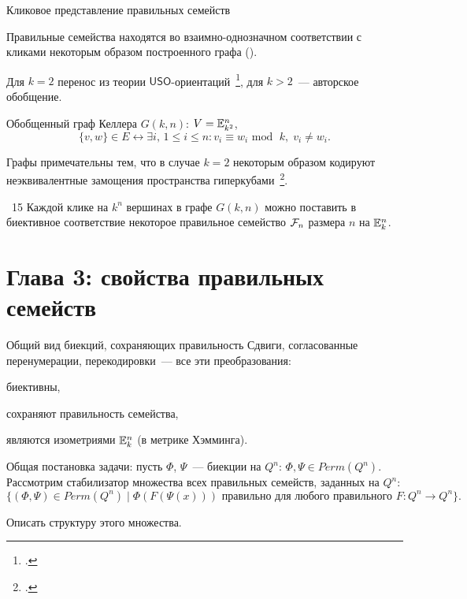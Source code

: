 \begin{frame}{Кликовое представление правильных семейств}
    \begin{coloritemize}
        \item Правильные семейства находятся во взаимно-однозначном соответствии с кликами некоторым образом построенного графа ().
        \pause
        \item Для $k=2$ перенос из теории $\mathsf{USO}$-ориентаций~\footcite{borzechowski2022universal}, для $k > 2$~--- авторское обобщение.
        \pause
        \item Обобщенный граф Келлера $G(k, n)$: $V = \mathbb{E}_{k^2}^n$, 
        \[
            \{v, w\} \in E \leftrightarrow \exists i, \, 1 \le i \le n \colon v_i \equiv w_i \text{ mod } \; k, \; v_i \ne w_i.
        \]
        \pause
        \item Графы примечательны тем, что в случае $k = 2$ некоторым образом кодируют неэквивалентные замощения пространства гиперкубами~\footcite{sikiric2007cube, mathew2013enumerating}.
    \end{coloritemize}
    \pause
    \begin{mytheorem}{\thm~15}
        Каждой клике на $k^n$ вершинах в графе $G(k, n)$ можно поставить в биективное соответствие некоторое правильное семейство $\mathcal{F}_n$ размера $n$ на $\mathbb{E}_k^n$.
    \end{mytheorem}
\end{frame}


\section{Глава 3: свойства правильных семейств}

\begin{frame}{Общий вид биекций, сохраняющих правильность}
    Сдвиги, согласованные перенумерации, перекодировки~--- все эти преобразования:
    \begin{coloritemize}
        \item биективны,
        \pause 
        \item сохраняют правильность семейства,
        \pause 
        \item являются изометриями $\mathbb{E}_k^n$ (в метрике Хэмминга).
    \end{coloritemize}

    \pause
    Общая постановка задачи: пусть $\Phi$, $\Psi$~--- биекции на $Q^n$: $\Phi, \Psi \in Perm(Q^n)$.
    Рассмотрим стабилизатор множества всех правильных семейств, заданных на $Q^n$:
    \[
        \{(\Phi, \Psi) \in Perm(Q^n) \mid \Phi(F(\Psi(x))) \text{ правильно для любого правильного } F \colon Q^n \to Q^n \}.  
    \]
        
    \pause
    Описать структуру этого множества.
\end{frame}


